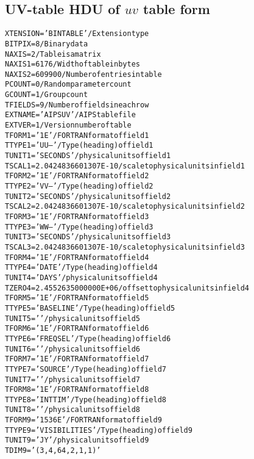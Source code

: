 \documentclass[twoside]{article}
\begin{document}
\subsection{UV-table HDU of $uv$ table form}
\label{Appe:UVtable}
\small
\begin{alltt}
XTENSION= 'BINTABLE'           / Extension type
BITPIX  =                    8 / Binary data
NAXIS   =                    2 / Table is a matrix
NAXIS1  =                 6176 / Width of table in bytes
NAXIS2  =               609900 / Number of entries in table
PCOUNT  =                    0 / Random parameter count
GCOUNT  =                    1 / Group count
TFIELDS =                    9 / Number of fields in each row
EXTNAME = 'AIPS UV '           / AIPS table file
EXTVER  =                    1 / Version number of table
TFORM1  = '1E      '           / FORTRAN format of field  1
TTYPE1  = 'UU--            '   / Type (heading) of field  1
TUNIT1  = 'SECONDS '           / physical units of field  1
TSCAL1  =  2.0424836601307E-10 / scale to physical units in field  1
TFORM2  = '1E      '           / FORTRAN format of field  2
TTYPE2  = 'VV--            '   / Type (heading) of field  2
TUNIT2  = 'SECONDS '           / physical units of field  2
TSCAL2  =  2.0424836601307E-10 / scale to physical units in field  2
TFORM3  = '1E      '           / FORTRAN format of field  3
TTYPE3  = 'WW--            '   / Type (heading) of field  3
TUNIT3  = 'SECONDS '           / physical units of field  3
TSCAL3  =  2.0424836601307E-10 / scale to physical units in field  3
TFORM4  = '1E      '           / FORTRAN format of field  4
TTYPE4  = 'DATE            '   / Type (heading) of field  4
TUNIT4  = 'DAYS    '           / physical units of field  4
TZERO4  =  2.4552635000000E+06 / offset to physical units in field  4
TFORM5  = '1E      '           / FORTRAN format of field  5
TTYPE5  = 'BASELINE        '   / Type (heading) of field  5
TUNIT5  = '        '           / physical units of field  5
TFORM6  = '1E      '           / FORTRAN format of field  6
TTYPE6  = 'FREQSEL         '   / Type (heading) of field  6
TUNIT6  = '        '           / physical units of field  6
TFORM7  = '1E      '           / FORTRAN format of field  7
TTYPE7  = 'SOURCE          '   / Type (heading) of field  7
TUNIT7  = '        '           / physical units of field  7
TFORM8  = '1E      '           / FORTRAN format of field  8
TTYPE8  = 'INTTIM          '   / Type (heading) of field  8
TUNIT8  = '        '           / physical units of field  8
TFORM9  = '1536E   '           / FORTRAN format of field  9
TTYPE9  = 'VISIBILITIES    '   / Type (heading) of field  9
TUNIT9  = 'JY      '           / physical units of field  9
TDIM9   = '(3,4,64,2,1,1)'


\end{alltt}
\end{document}
